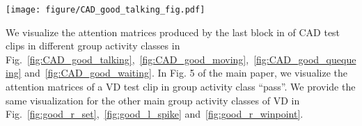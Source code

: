 \documentclass[runningheads]{llncs}
\begin{document}
  
\begin{figure*}[t]
	\centering
	\texttt{[image: figure/CAD\_good\_talking\_fig.pdf]}
	\caption{\textbf{Qualitative results of \ours on CAD} -- showcasing attention matrices of a test set instance in the ``\textbf{talking}'' class. The person to person group mapping identified by \ourseos, estimated keypoints from the backbone, and the ground truth person bounding boxes with action labels are also shown on the left side of the figure. 
}
	\label{fig:CAD_good_talking}
\end{figure*} 
We visualize the attention matrices produced by the last \mtx block in \ours of CAD test clips in different group activity classes in 
Fig.~\ref{fig:CAD_good_talking},~\ref{fig:CAD_good_moving},~\ref{fig:CAD_good_quequeing} and~\ref{fig:CAD_good_waiting}.
In Fig. 5 of the main paper, we visualize the attention matrices of a VD test clip in group activity class ``pass''. We provide the same visualization for the other  main group activity classes of VD 
in Fig.~\ref{fig:good_r_set},~\ref{fig:good_l_spike} and~\ref{fig:good_r_winpoint}. 
\end{document}
